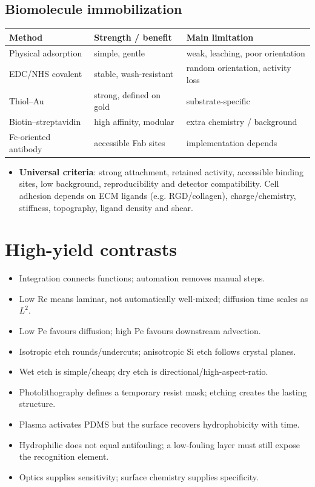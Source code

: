 \documentclass[10pt,a4paper]{ctexart}
\newcommand{\key}[1]{\textbf{#1}}
\begin{document}
\begin{multicols*}{2}
\subsection{Biomolecule immobilization}
\begin{center}\small
\scriptsize\begin{tabularx}{\linewidth}{@{}lYY@{}}
\toprule Method & Strength / benefit & Main limitation\\ \midrule
Physical adsorption & simple, gentle & weak, leaching, poor orientation\\
EDC/NHS covalent & stable, wash-resistant & random orientation, activity loss\\
Thiol--Au & strong, defined on gold & substrate-specific\\
Biotin--streptavidin & high affinity, modular & extra chemistry / background\\
Fc-oriented antibody & accessible Fab sites & implementation depends\\
\bottomrule
\end{tabularx}\end{center}
\begin{itemize}
	\item \key{Universal criteria}: strong attachment, retained activity, accessible binding sites, low background, 
	reproducibility and detector compatibility. Cell adhesion depends on ECM ligands (e.g. RGD/collagen), 
	charge/chemistry, stiffness, topography, ligand density and shear.
\end{itemize}

\section*{High-yield contrasts}
\begin{itemize}
	\item Integration connects functions; automation removes manual steps.
	\item Low Re means laminar, not automatically well-mixed; diffusion time scales as \(L^2\).
	\item Low Pe favours diffusion; high Pe favours downstream advection.
	\item Isotropic etch rounds/undercuts; anisotropic Si etch follows crystal planes.
	\item Wet etch is simple/cheap; dry etch is directional/high-aspect-ratio.
	\item Photolithography defines a temporary resist mask; etching creates the lasting structure.
	\item Plasma activates PDMS but the surface recovers hydrophobicity with time.
	\item Hydrophilic does not equal antifouling; a low-fouling layer must still expose the recognition element.
	\item Optics supplies sensitivity; surface chemistry supplies specificity.
\end{itemize}

\end{multicols*}
\end{document}
